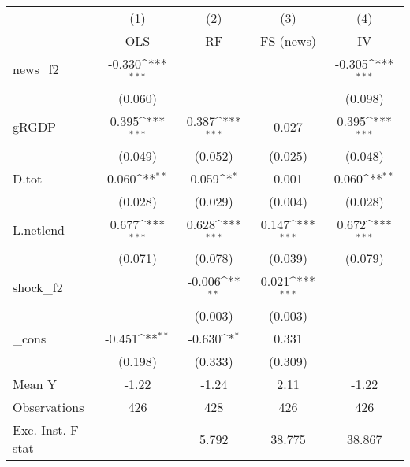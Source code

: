 {
\def\sym#1{\ifmmode^{#1}\else\(^{#1}\)\fi}
\begin{tabular}{l*{4}{c}}
\toprule
            &\multicolumn{1}{c}{(1)}&\multicolumn{1}{c}{(2)}&\multicolumn{1}{c}{(3)}&\multicolumn{1}{c}{(4)}\\
            &\multicolumn{1}{c}{OLS}&\multicolumn{1}{c}{RF}&\multicolumn{1}{c}{FS (news)}&\multicolumn{1}{c}{IV}\\
\midrule
news\_f2     &      -0.330\sym{***}&                     &                     &      -0.305\sym{***}\\
            &     (0.060)         &                     &                     &     (0.098)         \\
\addlinespace
gRGDP       &       0.395\sym{***}&       0.387\sym{***}&       0.027         &       0.395\sym{***}\\
            &     (0.049)         &     (0.052)         &     (0.025)         &     (0.048)         \\
\addlinespace
D.tot       &       0.060\sym{**} &       0.059\sym{*}  &       0.001         &       0.060\sym{**} \\
            &     (0.028)         &     (0.029)         &     (0.004)         &     (0.028)         \\
\addlinespace
L.netlend   &       0.677\sym{***}&       0.628\sym{***}&       0.147\sym{***}&       0.672\sym{***}\\
            &     (0.071)         &     (0.078)         &     (0.039)         &     (0.079)         \\
\addlinespace
shock\_f2    &                     &      -0.006\sym{**} &       0.021\sym{***}&                     \\
            &                     &     (0.003)         &     (0.003)         &                     \\
\addlinespace
\_cons      &      -0.451\sym{**} &      -0.630\sym{*}  &       0.331         &                     \\
            &     (0.198)         &     (0.333)         &     (0.309)         &                     \\
\midrule
Mean Y      &       -1.22         &       -1.24         &        2.11         &       -1.22         \\
Observations&         426         &         428         &         426         &         426         \\
Exc. Inst. F-stat&                     &       5.792         &      38.775         &      38.867         \\
\bottomrule
\end{tabular}
}

